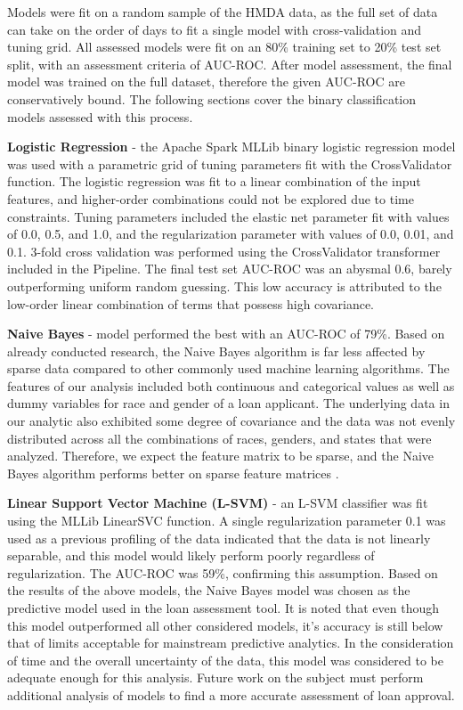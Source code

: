 \documentclass[conference,compsoc]{IEEEtran}
\begin{document}
Models were fit on a random sample of the HMDA data, as the full set of data can take on the order of days to fit a single model with cross-validation and tuning grid. All assessed models were fit on an 80\% training set to 20\% test set split, with an assessment criteria of AUC-ROC. After model assessment, the final model was trained on the full dataset, therefore the given AUC-ROC are conservatively bound. The following sections cover the binary classification models assessed with this process.

\textbf{Logistic Regression} - the Apache Spark MLLib binary logistic regression model was used with a parametric grid of tuning parameters fit with the CrossValidator function. The logistic regression was fit to a linear combination of the input features, and higher-order combinations could not be explored due to time constraints. Tuning parameters included the elastic net parameter fit with values of 0.0, 0.5, and 1.0, and the regularization parameter with values of 0.0, 0.01, and 0.1. 3-fold cross validation was performed using the CrossValidator transformer included in the Pipeline. The final test set AUC-ROC was an abysmal 0.6, barely outperforming uniform random guessing. This low accuracy is attributed to the low-order linear combination of terms that possess high covariance. 

\textbf{Naive Bayes} - model performed the best with an AUC-ROC of 79\%. Based on already conducted research, the Naive Bayes algorithm is far less affected by sparse data compared to other commonly used machine learning algorithms.  The features of our analysis included both continuous and categorical values as well as dummy variables for race and gender of a loan applicant.  The underlying data in our analytic also exhibited some degree of covariance and the data was not evenly distributed across all the combinations of races, genders, and states that were analyzed.  Therefore, we expect the feature matrix to be sparse, and the Naive Bayes algorithm performs better on sparse feature matrices \cite{naiveBayes}.  

\textbf{Linear Support Vector Machine (L-SVM)} - an L-SVM classifier was fit using the MLLib LinearSVC function. A single regularization parameter 0.1 was used as a previous profiling of the data indicated that the data is not linearly separable, and this model would likely perform poorly regardless of regularization. The AUC-ROC was 59\%, confirming this assumption.
Based on the results of the above models, the Naive Bayes model was chosen as the predictive model used in the loan assessment tool. It is noted that even though this model outperformed all other considered models, it’s accuracy is still below that of limits acceptable for mainstream predictive analytics. In the consideration of time and the overall uncertainty of the data, this model was considered to be adequate enough for this analysis. Future work on the subject must perform additional analysis of models to find a more accurate assessment of loan approval.
\end{document}
